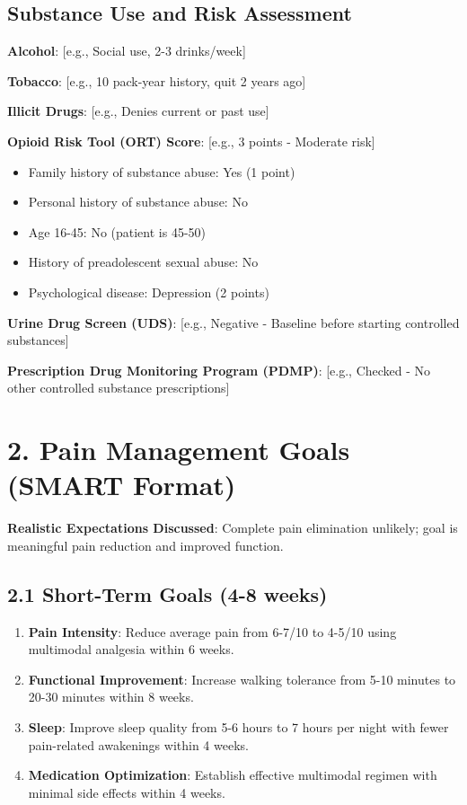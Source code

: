 \documentclass[11pt,letterpaper]{article}
\begin{document}
\subsection*{Substance Use and Risk Assessment}

\textbf{Alcohol}: [e.g., Social use, 2-3 drinks/week]

\textbf{Tobacco}: [e.g., 10 pack-year history, quit 2 years ago]

\textbf{Illicit Drugs}: [e.g., Denies current or past use]

\textbf{Opioid Risk Tool (ORT) Score}: [e.g., 3 points - Moderate risk]
\begin{itemize}[leftmargin=*]
    \item Family history of substance abuse: Yes (1 point)
    \item Personal history of substance abuse: No
    \item Age 16-45: No (patient is 45-50)
    \item History of preadolescent sexual abuse: No
    \item Psychological disease: Depression (2 points)
\end{itemize}

\textbf{Urine Drug Screen (UDS)}: [e.g., Negative - Baseline before starting controlled substances]

\textbf{Prescription Drug Monitoring Program (PDMP)}: [e.g., Checked - No other controlled substance prescriptions]

\section*{2. Pain Management Goals (SMART Format)}

\textbf{Realistic Expectations Discussed}: Complete pain elimination unlikely; goal is meaningful pain reduction and improved function.

\subsection*{2.1 Short-Term Goals (4-8 weeks)}

\begin{enumerate}[leftmargin=*]
    \item \textbf{Pain Intensity}: Reduce average pain from 6-7/10 to 4-5/10 using multimodal analgesia within 6 weeks.
    
    \item \textbf{Functional Improvement}: Increase walking tolerance from 5-10 minutes to 20-30 minutes within 8 weeks.
    
    \item \textbf{Sleep}: Improve sleep quality from 5-6 hours to 7 hours per night with fewer pain-related awakenings within 4 weeks.
    
    \item \textbf{Medication Optimization}: Establish effective multimodal regimen with minimal side effects within 4 weeks.
\end{enumerate}
\end{document}
